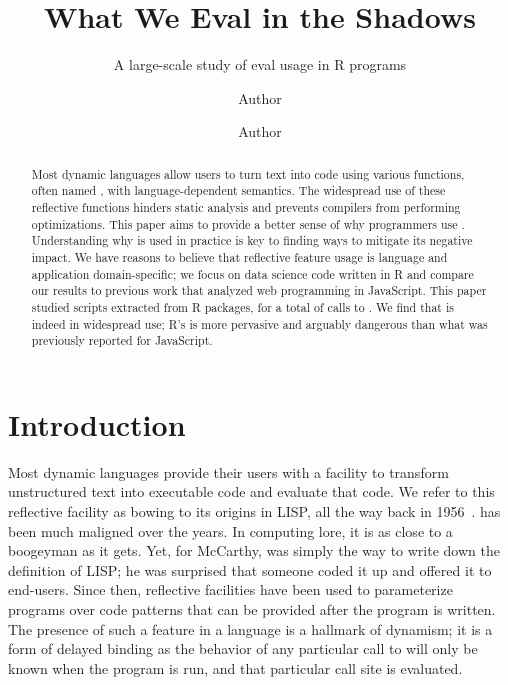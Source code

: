\documentclass[review,screen,acmsmall,anonymous=true]{acmart}
\begin{document}
\title{What We Eval in the Shadows}
\subtitle{A large-scale study of {\sf eval} usage in R programs}

\author{Author }
\orcid{}\author{Author}\authornotemark[1]

\begin{abstract}
  \noindent Most dynamic languages allow users to turn text into code using
  various functions, often named \eval, with language-dependent semantics. The
  widespread use of these reflective functions hinders static analysis and
  prevents compilers from performing optimizations. This paper aims to provide a
  better sense of why programmers use \eval. Understanding why \eval is used in
  practice is key to finding ways to mitigate its negative impact. We have
  reasons to believe that reflective feature usage is language and application
  domain-specific; we focus on data science code written in R and compare our
  results to previous work that analyzed web programming in JavaScript. This
  paper studied \CranRunnableScripts scripts extracted from \CranPackages R
  packages, for a total of \packageAllcalls calls to \eval. We find that \eval
  is indeed in widespread use; R's \eval is more pervasive and arguably
  dangerous than what was previously reported for JavaScript.
\end{abstract}

\maketitle

\section{Introduction}

Most dynamic languages provide their users with a facility to
transform unstructured text into executable code and evaluate that
code. We refer to this reflective facility as \eval bowing to its
origins in LISP, all the way back in 1956~\cite{lisp}. \Eval has been
much maligned over the years. In computing lore, it is as close to a
boogeyman as it gets. Yet, for McCarthy, \eval was simply the way to
write down the definition of LISP; he was surprised that someone coded
it up and offered it to end-users. Since then, reflective facilities
have been used to parameterize programs over code patterns that can be
provided after the program is written. The presence of such a feature
in a language is a hallmark of dynamism; it is a form of delayed
binding as the behavior of any particular call to \eval will only be
known when the program is run, and that particular call site is
evaluated.
\end{document}

